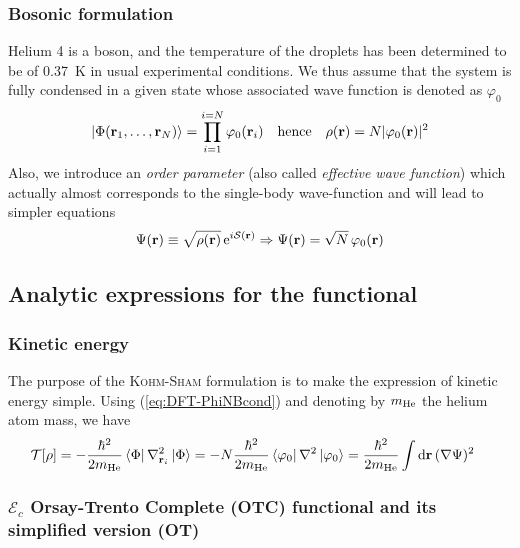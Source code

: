 \subsubsection{Bosonic formulation}
Helium 4 is a boson, and the temperature of the droplets has been determined to be of 0.37~K in usual experimental conditions. We thus assume that the system is fully condensed in a given state whose associated wave function is denoted as $\varphi_0$
\begin{align}\label{eq:DFT-PhiNBcond}%
\ket{\Phi(\vb{r}_1, \ldots, \vb{r}_N)} = \prod_{i=1}^{i=N} \varphi_0(\vb{r}_i) \quad\text{hence}\quad \rho(\vb{r}) = N |\varphi_0(\vb{r})|^2
\end{align}
Also, we introduce an \textit{order parameter} (also called \emph{effective wave function}) which actually almost corresponds to the single-body wave-function and will lead to simpler equations
\begin{align}\label{eq:DFT-order-param-def}
\Psi(\vb{r}) \equiv \sqrt{\rho(\vb{r})} \, \mathrm{e}^{i\mathcal{S}(\vb{r})} \Rightarrow \Psi(\vb{r})=\sqrt{N}\, \varphi_0(\vb{r})
\end{align}

\subsection{Analytic expressions for the functional}

\label{sec:DFT-func-analytics}

\subsubsection{Kinetic energy}
The purpose of the \textsc{Kohm-Sham} formulation is to make the expression of kinetic energy simple.
Using (\ref{eq:DFT-PhiNBcond}) and denoting by $m_{\mathrm{He}}$ the helium atom mass, we have
\begin{align}\label{eq:DFT-Tfunc}
\mathcal{T}[\rho] &= -\frac{\hbar^2}{2m_{\mathrm{He}}} \bra{\Phi}\vb{\nabla}^2_{\vb{r}_i} \ket{\Phi}  = -N\frac{\hbar^2}{2m_{\mathrm{He}}} \bra{\varphi_0}\vb{\nabla}^2 \ket{\varphi_0} = \frac{\hbar^2}{2m_{\mathrm{He}}} \int \dd{\vb{r}} (\nabla \Psi)^2 
\end{align}

\subsubsection{$\mathcal{E}_c$ Orsay-Trento Complete (OTC) functional and its simplified version (OT)}

